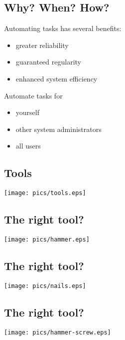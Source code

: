 \documentclass[xga]{xdvislides}
\begin{document}
\subsection{Why?  When?  How?}
Automating tasks has several benefits:
\begin{itemize}
	\item greater reliability
	\item guaranteed regularity
	\item enhanced system efficiency
\end{itemize}
\vspace{.5in}
Automate tasks for
\begin{itemize}
	\item yourself
	\item other system administrators
	\item all users
\end{itemize}


\subsection{Tools}
\vspace*{\fill}
\begin{center}
	\texttt{[image: pics/tools.eps]}
\end{center}
\vspace*{\fill}

\subsection{The right tool?}
\vspace*{\fill}
\begin{center}
	\texttt{[image: pics/hammer.eps]}
\end{center}
\vspace*{\fill}

\subsection{The right tool?}
\vspace*{\fill}
\begin{center}
	\texttt{[image: pics/nails.eps]}
\end{center}
\vspace*{\fill}

\subsection{The right tool?}
\vspace*{\fill}
\begin{center}
	\texttt{[image: pics/hammer-screw.eps]}
\end{center}
\vspace*{\fill}
\end{document}
